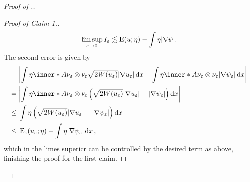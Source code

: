 \begin{proof}[Proof of .]
\begin{proof}[Proof of Claim 1.]
		\begin{equation*}
			\limsup_{ \varepsilon \to 0 }
				I_{ \varepsilon }
			\lesssim
			\operatorname{E} ( u ; \eta )
			-
			\int
				\eta
			\abs{ \nabla \psi }.
		\end{equation*}
		The second error is given by
		\begin{align*}
			& \abs{
				\int
					\eta
					\inner*{ A }{ \nu_{ \varepsilon } \otimes \nu_{ \varepsilon 
					} }
					\sqrt{ 2 W ( u_{ \varepsilon } ) }
					\abs{ \nabla u_{ \varepsilon } }
				\dd{ x }
				-
				\int
					\eta
					\inner*{ A }{ \nu_{ \varepsilon } \otimes \nu_{ \varepsilon 
					} }
					\abs{ \nabla \psi_{ \varepsilon } }
				\dd{ x }
			}
			\\
			={} &
			\abs{
				\int
					\eta
					\inner*{ A }{ \nu_{ \varepsilon } \otimes \nu_{ \varepsilon 
					} }
					\left(
						\sqrt{ 2 W ( u_{ \varepsilon } ) } \abs{ \nabla u_{ 
						\varepsilon } } 
						-
						\abs{ \nabla \psi_{ \varepsilon } }
					\right)
				\dd{ x }
			}
			\\
			\leq {} &
			\int
				\eta
				\left(
					\sqrt{ 2 W ( u_{ \varepsilon } ) }
					\abs{ \nabla u_{ \varepsilon } }
					-
					\abs{ \nabla \psi_{ \varepsilon } }
				\right)
			\dd{ x }
			\\
			\leq{} &
			\energy_{ \varepsilon } ( u_{ \varepsilon } ; \eta )
			-
			\int
				\eta 
				\abs{ \nabla \psi_{ \varepsilon } }
			\dd{ x },
		\end{align*}
		which in the limes superior can be controlled by the desired term as 
		above, finishing the proof for the first claim.
	\end{proof}
	

\end{proof}
